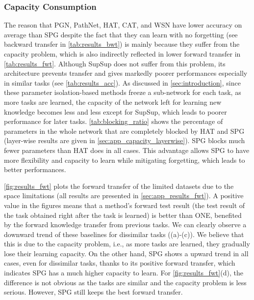 \subsubsection{Capacity Consumption} \label{sec:capacity}
The reason that PGN, PathNet, HAT, CAT, and WSN
have lower accuracy on average than SPG despite the fact that they can learn with no forgetting (see backward transfer in \cref{tab:results_bwt}) is mainly because they suffer from the capacity problem, which is also indirectly reflected in lower forward transfer in \cref{tab:results_fwt}.
Although SupSup does not suffer from this problem, its architecture prevents transfer and gives markedly poorer performances especially in similar tasks (see \cref{tab:results_acc}).
As discussed in \cref{sec:introduction}, since these parameter isolation-based methods freeze a sub-network for each task, as more tasks are learned, the capacity of the network left for learning new knowledge becomes less and less 
except for SupSup,
which leads to poorer performance for later tasks. 
\cref{tab:blocking_ratio} shows the percentage of parameters in the whole network that are completely blocked by HAT and SPG (layer-wise results are given in \cref{sec:app_capacity_layerwise}). 
SPG blocks much fewer parameters than HAT does in all cases. This advantage allows SPG to have more flexibility and capacity to learn while mitigating forgetting, which leads to better performances. 










\cref{fig:results_fwt} plots the forward transfer of the limited datasets due to the space limitations (all results are presented in \cref{sec:app_results_fwt}). 
A positive value in the figures means that a method's forward test result (the test result of the task obtained right after the task is learned) is better than ONE, benefited by the forward knowledge transfer from previous tasks.
We can clearly observe a downward trend of these baselines for dissimilar tasks ((a)-(c)).
We believe that this is due to the capacity problem, i.e., as more tasks are learned, they gradually lose their learning capacity. 
On the other hand, SPG shows a upward trend in all cases, even for dissimilar tasks, thanks to its positive forward transfer, which indicates SPG has a much higher capacity to learn.
For \cref{fig:results_fwt}(d), the difference is not obvious as the tasks are similar and the capacity problem is less serious.
However, SPG still keeps the best forward transfer.



